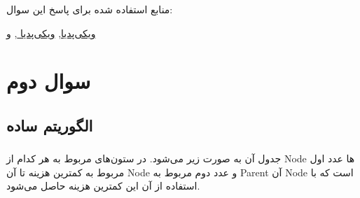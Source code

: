 \documentclass[12pt]{article}
\begin{document}
\begin{enumerate}
منابع استفاده شده برای پاسخ این سوال:

 \href{https://en.wikipedia.org/wiki/Hole_punching_(networking)}{ویکی‌پدیا}, \href{https://en.wikipedia.org/wiki/Network_address_translation}{ویکی‌پدیا }, \href{https://resources.infosecinstitute.com/topic/udp-hole-punching/}{} و \href{https://bford.info/pub/net/p2pnat/}{}
 
\end{enumerate}

\newpage
\section{سوال دوم}

\subsection{الگوریتم ساده}

\subsubsection{}

جدول آن به صورت زیر می‌شود. در ستون‌های مربوط به هر کدام از Node ها عدد اول مربوط به کمترین هزینه تا آن Node و عدد دوم مربوط به Parent آن Node است که با استفاده از آن این کمترین هزینه حاصل می‌شود.

\begin{center}
	\begin{latin}
		\begin{table}[h!]
			\centering
		\end{table}
	\end{latin}
\end{center}
\end{document}
